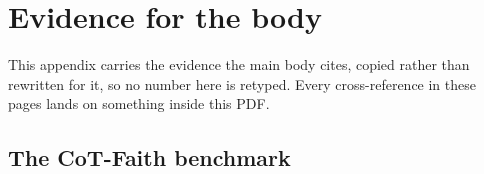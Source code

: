 %

\section{Evidence for the body}
\label{sec:appendix}

This appendix carries the evidence the main body cites, copied rather
than rewritten for it, so no number here is retyped. Every cross-reference in
these pages lands on something inside this PDF.

\subsection{The CoT-Faith benchmark}
\label{app:sec:benchmark}

